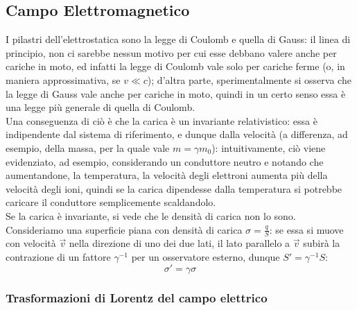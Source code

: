 \subsection{Campo Elettromagnetico}

I pilastri dell'elettrostatica sono la legge di Coulomb e quella di Gauss: il linea di principio, non ci sarebbe nessun motivo per cui esse debbano valere anche per cariche in moto, ed infatti la legge di Coulomb vale solo per cariche ferme (o, in maniera approssimativa, se $ v \ll c $); d'altra parte, sperimentalmente si osserva che la legge di Gauss vale anche per cariche in moto, quindi in un certo senso essa è una legge più generale di quella di Coulomb. \\ 
%
Una conseguenza di ciò è che la carica è un invariante relativistico: essa è indipendente dal sistema di riferimento, e dunque dalla velocità (a differenza, ad esempio, della massa, per la quale vale $ m = \gamma m_0 $): intuitivamente, ciò viene evidenziato, ad esempio, considerando un conduttore neutro e notando che aumentandone, la temperatura, la velocità degli elettroni aumenta più della velocità degli ioni, quindi se la carica dipendesse dalla temperatura si potrebbe caricare il conduttore semplicemente scaldandolo. \\ 
%
Se la carica è invariante, si vede che le densità di carica non lo sono. \\ 
%
Consideriamo una superficie piana con densità di carica $ \sigma = \frac{q}{S} $: se essa si muove con velocità $ \vec{v} $ nella direzione di uno dei due lati, il lato parallelo a $ \vec{v} $ subirà la contrazione di un fattore $ \gamma^{-1} $ per un osservatore esterno, dunque $ S' = \gamma^{-1} S $:
\begin{equation}
	\sigma' = \gamma\sigma
	\label{eq:27}
\end{equation}

\subsubsection{Trasformazioni di Lorentz del campo elettrico}

